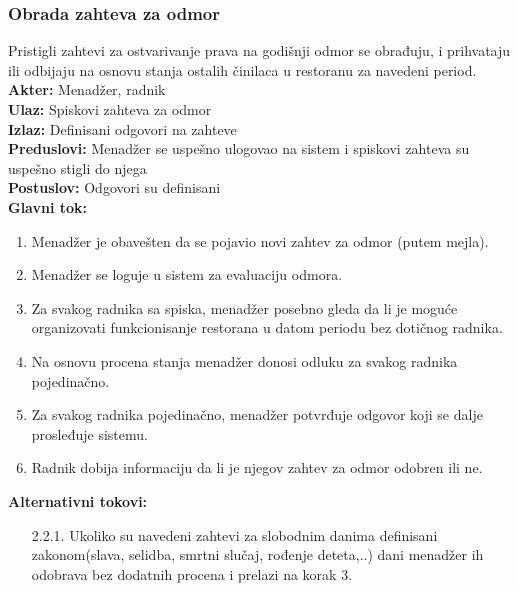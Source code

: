 \documentclass{article}
\begin{document}
\subsubsection{Obrada zahteva za odmor}
Pristigli zahtevi za ostvarivanje prava na godišnji odmor se obrađuju, i prihvataju ili odbijaju na osnovu stanja ostalih činilaca u restoranu za navedeni period.\\
\textbf{Akter:} Menadžer, radnik\\
\textbf{Ulaz:} Spiskovi zahteva za odmor\\
\textbf{Izlaz:} Definisani odgovori na zahteve\\
\textbf{Preduslovi:} Menadžer se uspešno ulogovao na sistem i spiskovi zahteva su uspešno stigli do njega\\
\textbf{Postuslov:} Odgovori su definisani\\
\textbf{Glavni tok:}
\begin{enumerate}
\item Menadžer je obavešten da se pojavio novi zahtev za odmor (putem mejla).
\item Menadžer se loguje u sistem za evaluaciju odmora.
\item Za svakog radnika sa spiska, menadžer posebno gleda da li je moguće organizovati funkcionisanje restorana u datom periodu bez dotičnog radnika.
\item Na osnovu procena stanja menadžer donosi odluku za svakog radnika pojedinačno.
\item Za svakog radnika pojedinačno, menadžer potvrđuje odgovor koji se dalje prosleđuje sistemu.
\item Radnik dobija informaciju da li je njegov zahtev za odmor odobren ili ne.
\end{enumerate}
\textbf{Alternativni tokovi:}\\
\begin{itemize}
\item[2.2.1.] Ukoliko su navedeni zahtevi za slobodnim danima definisani zakonom(slava, selidba, smrtni slučaj, rođenje deteta,..) dani menadžer ih odobrava bez dodatnih procena i prelazi na korak 3.
\end{itemize}
\end{document}
